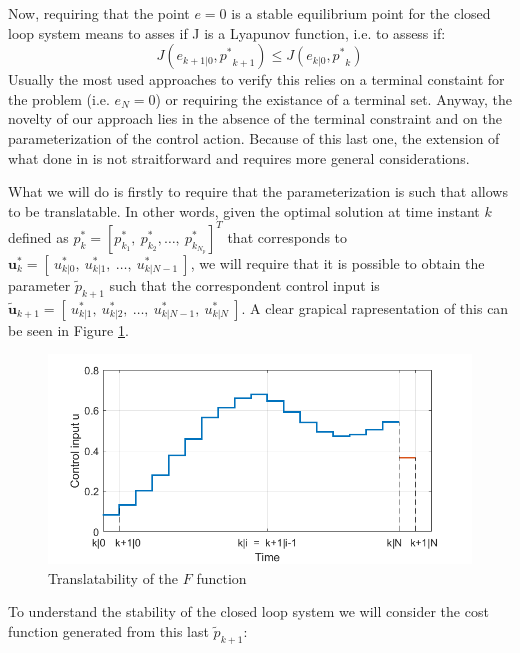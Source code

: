 \documentclass[12pt]{article}
\begin{document}
Now, requiring that the point $e=0$ is a stable equilibrium point for the closed loop system means to asses if J is a Lyapunov function, i.e. to assess if: 
\begin{equation}
	J({e}_{k+1|0},{p^*}_{k+1}) \leq J({e}_{k|0},{p^*}_k)
	\label{lyap_stab}
\end{equation}
Usually the most used approaches to verify this relies on a terminal constaint for the problem (i.e. $e_N=0$) or requiring the existance of a terminal set.
Anyway, the novelty of our approach lies in the absence of the terminal constraint and on the parameterization of the control action. Because of this last one, the extension of what done in \cite{alamir2018stability} is not straitforward and requires more general considerations. 

What we will do is firstly to require that the parameterization is such that allows to be translatable. In other words, given the optimal solution at time instant $k$ defined as $p_k^*=\left[ p_{k_1}^*,\ p_{k_2}^*,  \dots,\ p_{k_{N_p}}^* \right]^T$ that corresponds to $  \textbf{u}_k^*=[\ u_{k|0}^*,\ u_{k|1}^*,\  \dots,\  u_{k|{N-1}}^*\ ]$, we will require that it is possible to obtain the parameter $\tilde{p}_{k+1}$ such that the correspondent control input is $  \tilde{\textbf{u}}_{k+1}=[\ u_{k|1}^*,\ u_{k|2}^*,\  \dots,\  u_{k|{N-1}}^*,\ u_{k|N}^* \ ]$. A clear grapical rapresentation of this can be seen in Figure \ref{param_translatability}. 
\begin{figure}[h!]
	\centering
	\includegraphics[scale=0.6]{IMMAGINI/trans_u.png}
	\caption{Translatability of the $F$ function}
	\label{param_translatability}
\end{figure}

To understand the stability of the closed loop system we will consider the cost function generated from this last $\tilde{p}_{k+1}$:
\end{document}
